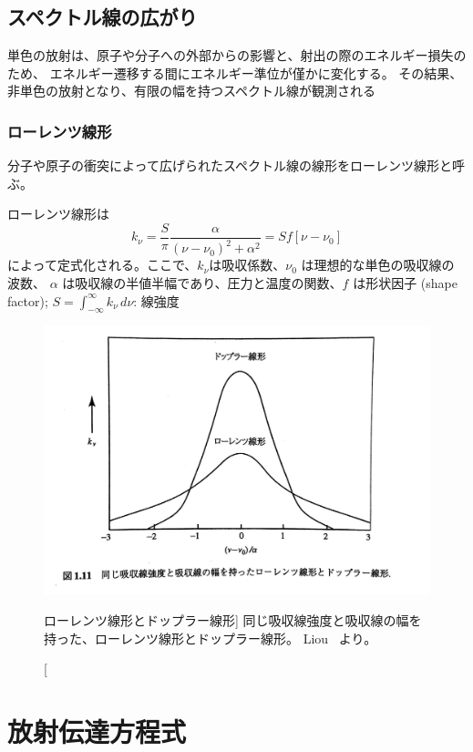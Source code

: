 \documentclass[book]{dennou777}
\begin{document}
\section{スペクトル線の広がり}
単色の放射は、原子や分子への外部からの影響と、射出の際のエネルギー損失のため、
エネルギー遷移する間にエネルギー準位が僅かに変化する。
その結果、非単色の放射となり、有限の幅を持つスペクトル線が観測される

\subsection{ローレンツ線形}
分子や原子の衝突によって広げられたスペクトル線の線形をローレンツ線形と呼ぶ。

ローレンツ線形は
\begin{equation}
	k_\nu=\frac{S}{\pi}\frac{\alpha}{(\nu-\nu_0)^2+\alpha^2}=Sf[\nu-\nu_0]
\end{equation}
によって定式化される。ここで、$k_\nu$は吸収係数、$\nu_0$ は理想的な単色の吸収線の波数、
$\alpha$ は吸収線の半値半幅であり、圧力と温度の関数、$f$ は形状因子 (shape factor);\quad
$\displaystyle S=\int^\infty_{-\infty}k_\nu\,d\nu$: 線強度

\begin{figure}[t]
	\includegraphics[width=\textwidth]{lorentz.jpg}
	\caption
		[ローレンツ線形とドップラー線形]
		{
			同じ吸収線強度と吸収線の幅を持った、ローレンツ線形とドップラー線形。
			Liou~\cite{liou} より。
		}
\end{figure}

\chapter{放射伝達方程式}
\end{document}

